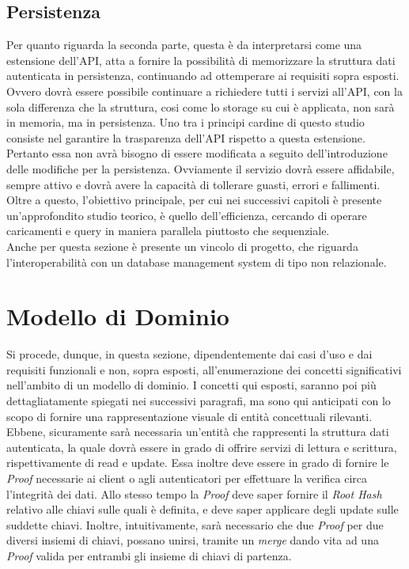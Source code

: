 	\subsection{Persistenza}
	
	Per quanto riguarda la seconda parte, questa è da interpretarsi come una estensione dell'API, atta a fornire la possibilità di memorizzare la struttura dati autenticata in persistenza, continuando ad ottemperare ai requisiti sopra esposti. Ovvero dovrà essere possibile continuare a richiedere tutti i servizi all'API, con la sola differenza che la struttura, cosi come lo storage su cui è applicata, non sarà in memoria, ma in persistenza. Uno tra i principi cardine di questo studio consiste nel garantire la trasparenza dell'API rispetto a questa estensione. Pertanto essa non avrà bisogno di essere modificata a seguito dell'introduzione delle modifiche per la persistenza. Ovviamente il servizio dovrà essere affidabile, sempre attivo e dovrà avere la capacità di tollerare guasti, errori e fallimenti.
	Oltre a questo, l'obiettivo principale, per cui nei successivi capitoli è presente un'approfondito studio teorico, è quello dell'efficienza, cercando di operare caricamenti e query in maniera parallela piuttosto che sequenziale. \\
	Anche per questa sezione è presente un vincolo di progetto, che riguarda l'interoperabilità con un database management system di tipo non relazionale.

\section{Modello di Dominio}

	
 	Si procede, dunque, in questa sezione, dipendentemente dai casi d'uso e dai requisiti funzionali e non, sopra esposti, all'enumerazione dei concetti significativi nell'ambito di un modello di dominio. I concetti qui esposti, saranno poi più dettagliatamente spiegati nei successivi paragrafi, ma sono qui anticipati con lo scopo di fornire una rappresentazione visuale di entità concettuali rilevanti.
 	Ebbene, sicuramente sarà necessaria un'entità che rappresenti la struttura dati autenticata, la quale dovrà essere in grado di offrire servizi di lettura e scrittura, rispettivamente di read e update. Essa inoltre deve essere in grado di fornire le \textit{Proof} necessarie ai client o agli autenticatori per effettuare la verifica circa l'integrità dei dati. Allo stesso tempo la \textit{Proof} deve saper fornire il \textit{Root Hash} relativo alle chiavi sulle quali è definita, e deve saper applicare degli update sulle suddette chiavi. Inoltre, intuitivamente, sarà necessario che due \textit{Proof} per due diversi insiemi di chiavi, possano unirsi, tramite un \textit{merge} dando vita ad una \textit{Proof} valida per entrambi gli insieme di chiavi di partenza.

